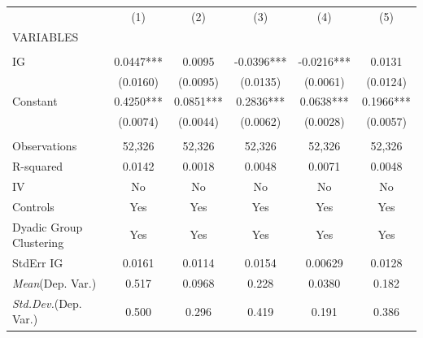 \documentclass[]{article}
\begin{document}
\begin{tabular}{lccccc} \hline
 & (1) & (2) & (3) & (4) & (5) \\
VARIABLES &  &  &  &  &  \\ \hline
 &  &  &  &  &  \\
IG & 0.0447*** & 0.0095 & -0.0396*** & -0.0216*** & 0.0131 \\
 & (0.0160) & (0.0095) & (0.0135) & (0.0061) & (0.0124) \\
Constant & 0.4250*** & 0.0851*** & 0.2836*** & 0.0638*** & 0.1966*** \\
 & (0.0074) & (0.0044) & (0.0062) & (0.0028) & (0.0057) \\
 &  &  &  &  &  \\
Observations & 52,326 & 52,326 & 52,326 & 52,326 & 52,326 \\
R-squared & 0.0142 & 0.0018 & 0.0048 & 0.0071 & 0.0048 \\
IV & No & No & No & No & No \\
Controls & Yes & Yes & Yes & Yes & Yes \\
Dyadic Group Clustering & Yes & Yes & Yes & Yes & Yes \\
StdErr IG & 0.0161 & 0.0114 & 0.0154 & 0.00629 & 0.0128 \\
\textit{Mean}(Dep. Var.) & 0.517 & 0.0968 & 0.228 & 0.0380 & 0.182 \\
 \textit{Std.Dev.}(Dep. Var.) & 0.500 & 0.296 & 0.419 & 0.191 & 0.386 \\ \hline
\end{tabular}
\end{document}
